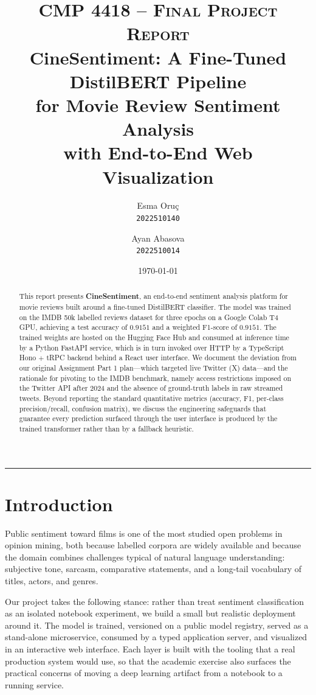 \documentclass[11pt, a4paper]{article}
\title{
  \vspace{-1.5cm}
  \large \textsc{CMP 4418 -- Final Project Report} \\
  \vspace{0.4cm}
  \LARGE \textbf{CineSentiment: A Fine-Tuned DistilBERT Pipeline\\for Movie Review Sentiment Analysis} \\
  \vspace{0.5cm}
  \large with End-to-End Web Visualization
}
\author{
  Esma Oru\c{c} \\ \texttt{2022510140}
  \and
  Ayan Abasova \\ \texttt{2022510014}
}
\date{\today}
\begin{document}
\maketitle

\begin{abstract}
\noindent
This report presents \textbf{CineSentiment}, an end-to-end sentiment analysis platform for movie reviews built around a fine-tuned DistilBERT classifier. The model was trained on the IMDB 50k labelled reviews dataset for three epochs on a Google Colab T4 GPU, achieving a test accuracy of $0.9151$ and a weighted F1-score of $0.9151$. The trained weights are hosted on the Hugging Face Hub and consumed at inference time by a Python FastAPI service, which is in turn invoked over HTTP by a TypeScript Hono $+$ tRPC backend behind a React user interface. We document the deviation from our original Assignment Part 1 plan---which targeted live Twitter (X) data---and the rationale for pivoting to the IMDB benchmark, namely access restrictions imposed on the Twitter API after 2024 and the absence of ground-truth labels in raw streamed tweets. Beyond reporting the standard quantitative metrics (accuracy, F1, per-class precision/recall, confusion matrix), we discuss the engineering safeguards that guarantee every prediction surfaced through the user interface is produced by the trained transformer rather than by a fallback heuristic.
\end{abstract}

\tableofcontents
\vspace{0.4cm}
\hrule
\vspace{0.6cm}

\section{Introduction}

Public sentiment toward films is one of the most studied open problems in opinion mining, both because labelled corpora are widely available and because the domain combines challenges typical of natural language understanding: subjective tone, sarcasm, comparative statements, and a long-tail vocabulary of titles, actors, and genres.

Our project takes the following stance: rather than treat sentiment classification as an isolated notebook experiment, we build a small but realistic deployment around it. The model is trained, versioned on a public model registry, served as a stand-alone microservice, consumed by a typed application server, and visualized in an interactive web interface. Each layer is built with the tooling that a real production system would use, so that the academic exercise also surfaces the practical concerns of moving a deep learning artifact from a notebook to a running service.
\end{document}
